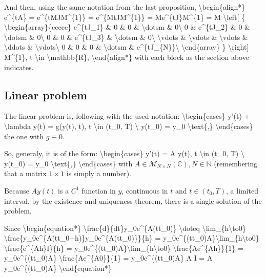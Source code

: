 \documentclass[letterpaper,10pt,english]{jupyterBook}
\begin{document}
\sphinxAtStartPar
And then, using the same notation from the last proposition,
\textbackslash{}begin\{align*\}
e\textasciicircum{}\{tA\} = e\textasciicircum{}\{tMJM\textasciicircum{}\{\sphinxhyphen{}1\}\} = e\textasciicircum{}\{MtJM\textasciicircum{}\{\sphinxhyphen{}1\}\} = Me\textasciicircum{}\{tJ\}M\textasciicircum{}\{\sphinxhyphen{}1\} = M \textbackslash{}left{[} \{ \textbackslash{}begin\{array\}\{ccccc\}
e\textasciicircum{}\{tJ\_1\} \& 0 \& 0 \& \textbackslash{}dotsm \& 0\textbackslash{}
0 \& e\textasciicircum{}\{tJ\_2\} \& 0 \& \textbackslash{}dotsm \& 0\textbackslash{}
0 \& 0 \& e\textasciicircum{}\{tJ\_3\} \& \textbackslash{}dotsm \& 0\textbackslash{}
\textbackslash{}vdots \& \textbackslash{}vdots \& \textbackslash{}vdots \& \textbackslash{}ddots \& \textbackslash{}vdots\textbackslash{}
0 \& 0 \& 0 \& \textbackslash{}dotsm \& e\textasciicircum{}\{tJ\_\{N\}\}\textbackslash{}
\textbackslash{}end\{array\} \} \textbackslash{}right{]} M\textasciicircum{}\{\sphinxhyphen{}1\}, t \textbackslash{}in \textbackslash{}mathbb\{R\},
\textbackslash{}end\{align*\}
with each block as the section above indicates.


\subsection{Linear problem}
\label{\detokenize{cap3:linear-problem}}
\sphinxAtStartPar
The linear problem is, following with the used notation:
\textbackslash{}begin\{cases\}
y’(t) + \textbackslash{}lambda y(t) = g(y(t), t), t \textbackslash{}in (t\_0, T) \textbackslash{}
y(t\_0) = y\_0
\textbackslash{}text\{,\}
\textbackslash{}end\{cases\}
the one with \(g \equiv 0.\)

\sphinxAtStartPar
So, generaly, it is of the form:
\textbackslash{}begin\{cases\}
y’(t) = A y(t), t \textbackslash{}in (t\_0, T) \textbackslash{}
y(t\_0) = y\_0
\textbackslash{}text\{,\}
\textbackslash{}end\{cases\}
with \(A \in \mathscr{M}_{N \times N}(\mathbb{C}), N \in \mathbb{N}\)  (remembering that a matrix \(1 \times 1\) is simply a number).

\sphinxAtStartPar
Because \(A y(t)\) is a \(C^1\) function in \(y\), continuous in \(t\) and \(t \in (t_0, T)\), a limited interval, by the existence and uniqueness theorem, there is a single solution of the problem.

\sphinxAtStartPar
Since
\textbackslash{}begin\{equation*\}
\textbackslash{}frac\{d\}\{dt\}y\_0e\textasciicircum{}\{A(t\sphinxhyphen{}t\_0)\} \textbackslash{}doteq \textbackslash{}lim\_\{h\textbackslash{}to0\} \textbackslash{}frac\{y\_0e\textasciicircum{}\{A(t\sphinxhyphen{}t\_0+h)\}\sphinxhyphen{}y\_0e\textasciicircum{}\{A(t\sphinxhyphen{}t\_0)\}\}\{h\} = y\_0e\textasciicircum{}\{(t\sphinxhyphen{}t\_0)A\}\textbackslash{}lim\_\{h\textbackslash{}to0\} \textbackslash{}frac\{e\textasciicircum{}\{Ah\}\sphinxhyphen{}I\}\{h\} = y\_0e\textasciicircum{}\{(t\sphinxhyphen{}t\_0)A\}\textbackslash{}lim\_\{h\textbackslash{}to0\} \textbackslash{}frac\{Ae\textasciicircum{}\{Ah\}\}\{1\} = y\_0e\textasciicircum{}\{(t\sphinxhyphen{}t\_0)A\} \textbackslash{}frac\{Ae\textasciicircum{}\{A0\}\}\{1\} = y\_0e\textasciicircum{}\{(t\sphinxhyphen{}t\_0)A\} A I = A y\_0e\textasciicircum{}\{(t\sphinxhyphen{}t\_0)A\}
\textbackslash{}end\{equation*\}
\end{document}
